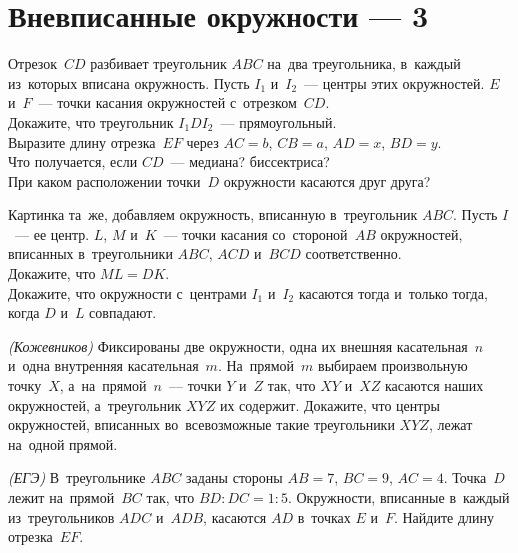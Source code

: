 
\section*{Вневписанные окружности --- 3}


\begin{problems}

\item
Отрезок~$CD$ разбивает треугольник $ABC$ на~два треугольника, в~каждый
из~которых вписана окружность.
Пусть $I_1$ и~$I_2$~--- центры этих окружностей.
$E$ и~$F$~--- точки касания окружностей с~отрезком~$CD$.
\\
\subproblem
Докажите, что треугольник $I_1 D I_2$~--- прямоугольный.
\\
\subproblem
Выразите длину отрезка~$EF$ через $AC = b$, $CB = a$, $AD = x$, $BD = y$.
\\
Что получается, если $CD$~--- медиана? биссектриса?
\\
\subproblem
При каком расположении точки~$D$ окружности касаются друг друга?

\item
Картинка та~же, добавляем окружность, вписанную в~треугольник $ABC$.
Пусть $I$~--- ее центр.
$L$, $M$ и~$K$~--- точки касания со~стороной~$AB$ окружностей, вписанных
в~треугольники $ABC$, $ACD$ и~$BCD$ соответственно.
\\
\subproblem
Докажите, что $ML = DK$.
\\
\subproblem
Докажите, что окружности с~центрами $I_1$ и~$I_2$ касаются тогда и~только
тогда, когда $D$ и~$L$ совпадают.

\item\emph{(Кожевников)}
Фиксированы две окружности, одна их внешняя касательная~$n$ и~одна внутренняя
касательная~$m$.
На~прямой~$m$ выбираем произвольную точку~$X$, а~на~прямой~$n$~---
точки $Y$ и~$Z$ так, что $XY$ и~$XZ$ касаются наших окружностей,
а~треугольник $XYZ$ их содержит.
Докажите, что центры окружностей, вписанных во~всевозможные такие
треугольники $XYZ$, лежат на~одной прямой.

\item\emph{(ЕГЭ)}
В~треугольнике $ABC$ заданы стороны $AB = 7$, $BC = 9$, $AC = 4$.
Точка~$D$ лежит на~прямой~$BC$ так, что $BD : DC = 1 : 5$.
Окружности, вписанные в~каждый из~треугольников $ADC$ и~$ADB$, касаются $AD$
в~точках $E$ и~$F$.
Найдите длину отрезка~$EF$.


\end{problems}
